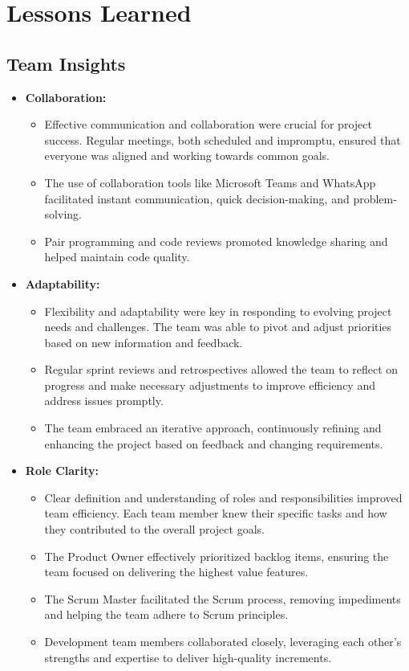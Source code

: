 \documentclass[11pt,a4paper]{article}
\begin{document}
    \section{Lessons Learned}\label{sec:lessons-learned}

    \subsection{Team Insights}\label{subsec:team-insights}
    \begin{itemize}
        \item \textbf{Collaboration:}
        \begin{itemize}
            \item Effective communication and collaboration were crucial for project success. Regular meetings, both scheduled and impromptu, ensured that everyone was aligned and working towards common goals.
            \item The use of collaboration tools like Microsoft Teams and WhatsApp facilitated instant communication, quick decision-making, and problem-solving.
            \item Pair programming and code reviews promoted knowledge sharing and helped maintain code quality.
        \end{itemize}

        \item \textbf{Adaptability:}
        \begin{itemize}
            \item Flexibility and adaptability were key in responding to evolving project needs and challenges. The team was able to pivot and adjust priorities based on new information and feedback.
            \item Regular sprint reviews and retrospectives allowed the team to reflect on progress and make necessary adjustments to improve efficiency and address issues promptly.
            \item The team embraced an iterative approach, continuously refining and enhancing the project based on feedback and changing requirements.
        \end{itemize}

        \item \textbf{Role Clarity:}
        \begin{itemize}
            \item Clear definition and understanding of roles and responsibilities improved team efficiency. Each team member knew their specific tasks and how they contributed to the overall project goals.
            \item The Product Owner effectively prioritized backlog items, ensuring the team focused on delivering the highest value features.
            \item The Scrum Master facilitated the Scrum process, removing impediments and helping the team adhere to Scrum principles.
            \item Development team members collaborated closely, leveraging each other's strengths and expertise to deliver high-quality increments.
        \end{itemize}


\end{itemize}
\end{document}
